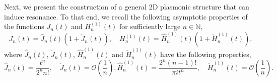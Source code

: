 \documentclass[11pt,reqno,twoside]{amsart}
\theoremstyle{definition}
\theoremstyle{remark}
\numberwithin{equation}{section}
\begin{document}
Next, we present the construction of a general 2D plasmonic structure that can induce resonance. To that end, we recall the following asymptotic properties of the functions $J_n(t)$ and $H_n^{(1)}(t)$ for sufficiently large $n\in\mathbb{N}$,
\begin{equation}\label{eq:asymptotic_J}
  J_n(t)=\hat{J}_n(t)\left(1+ \check{J}_n(t) \right),\quad  H_n^{(1)}(t)=\hat{H}_n^{(1)}(t) \left(1+\check{H}_n^{(1)}(t) \right),
\end{equation}
where  $\hat{J}_n(t)$, $\check{J}_n(t)$, $\hat{H}_n^{(1)}(t)$ and $\check{H}_n^{(1)}(t)$ have the following properties,
\begin{equation}\label{eq:dd2}
\hat{J}_n(t)=\frac{t^n}{2^n n!}, \quad \check{J}_n(t)=\mathcal{O}\left(\frac{1}{n}\right),
\hat{H}_n^{(1)}(t)=\frac{2^n (n-1)!}{\pi i t^n},  \quad \check{H}_n^{(1)}(t)=\mathcal{O}\left(\frac{1}{n}\right). 
\end{equation}
\end{document}
